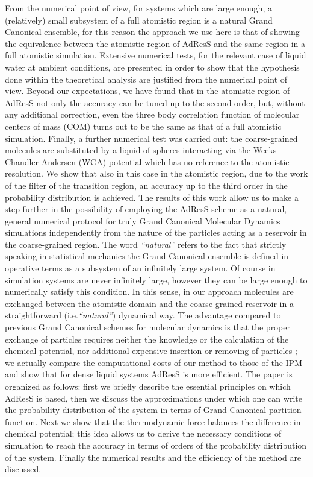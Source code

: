 \documentclass[aip,jcp,a4paper,reprint,onecolumn]{revtex4-1}
\newcommand{\redc}[1]{{\color{red} #1}}
\begin{document}
From the numerical point of view, for systems which are large enough, a (relatively) small subsystem of a full atomistic region is a 
natural Grand Canonical ensemble, for this reason the approach we use here is that of showing the equivalence between the atomistic region of AdResS and the same region in a full atomistic simulation.
Extensive numerical tests, for the relevant case of liquid water at ambient conditions, are presented in order to show that the hypothesis done within the theoretical analysis are justified from the numerical point of view. Beyond our expectations, we have found that in the atomistic region of AdResS not only the accuracy can be tuned up to the second order, but, without any additional correction, even the three body correlation function of molecular centers of mass (COM) turns out to be the same as that of a full atomistic simulation. Finally, a further numerical test was carried out: the coarse-grained molecules are substituted by a liquid of spheres interacting via the Weeks-Chandler-Andersen (WCA)  potential \cite{wca} which has no reference to the atomistic resolution. We show that also in this case in the atomistic region, due to the work of the filter of the transition region, an accuracy up to the third order in the probability distribution is achieved.
The results of this work allow us to make a step further in the possibility of employing the AdResS scheme as a natural, general numerical protocol for truly Grand Canonical Molecular Dynamics simulations
independently from the nature of the particles acting as a reservoir in the coarse-grained region. The word {\it ``natural''} refers to the fact  that strictly speaking in statistical mechanics the Grand Canonical ensemble is defined in operative terms as a subsystem of an infinitely large system. Of course in simulation systems are never infinitely large, however they can be large enough to numerically satisfy this condition. 
In this sense, in our approach molecules are exchanged between the atomistic domain and the coarse-grained reservoir in a straightforward (i.e.{\it ``natural''}) dynamical way. The advantage compared to previous Grand Canonical schemes for molecular dynamics is that the proper exchange of particles \redc{requires neither the knowledge or the calculation of the chemical potential, nor additional expensive insertion or removing of particles \cite{pet1,pet2,pet3,pet4,pet5,flo}; we actually compare the computational costs of our method to those of the IPM and show that for dense liquid systems AdResS is more efficient.} 
The paper is organized as follows: first we briefly describe the essential principles on which AdResS is based, then we discuss the approximations under which one can write the probability distribution of the system in terms of Grand Canonical partition function. Next we show that the thermodynamic force balances the difference in chemical potential; this idea allows us to derive the necessary conditions of simulation to reach the accuracy in terms of orders of the probability distribution of the system. 
Finally the numerical results \redc{and the efficiency of the method} are discussed.
\end{document}

